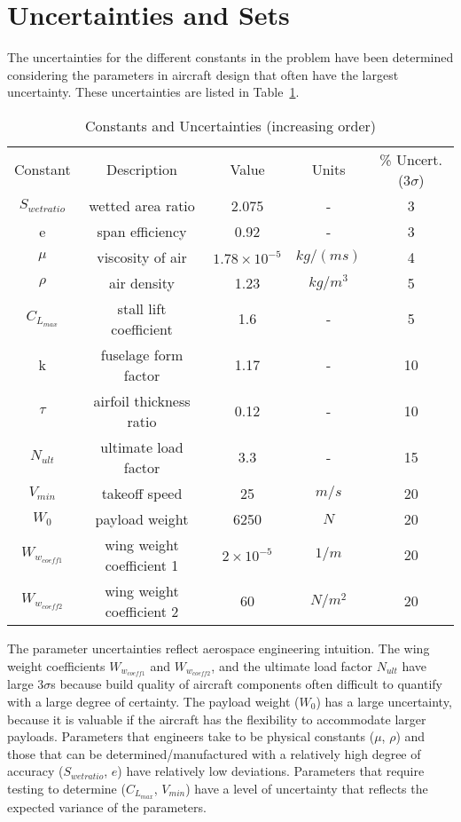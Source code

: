 \section{Uncertainties and Sets}

The uncertainties for the different constants in the problem have been determined
considering the parameters in aircraft design that often have the largest uncertainty.
These uncertainties are listed in Table~\ref{tab:uncertainties}.

\begin{table}
\begin{center}
\caption{\label{tab:uncertainties} Constants and Uncertainties (increasing order)}
\begin{tabular}{c c c c c}
\hline
Constant & Description & Value & Units &\% Uncert. ($3\sigma$) \\
$S_{wetratio}$ & wetted area ratio & 2.075 & - & 3\\
e & span efficiency & 0.92 & - & 3\\
$\mu$ & viscosity of air & $1.78 \times 10^{-5}$ & $kg/(ms)$ & 4 \\
$\rho$ & air density & 1.23 & $kg/m^3$ & 5 \\
$C_{L_{max}}$ & stall lift coefficient & 1.6 & - & 5\\
k & fuselage form factor & 1.17 & - & 10\\
$\tau$ & airfoil thickness ratio & 0.12 & - & 10\\
$N_{ult}$ & ultimate load factor & 3.3 & - & 15\\
$V_{min}$ & takeoff speed & 25 & $m/s$ & 20\\
$W_0$ & payload weight & 6250 & $N$ & 20\\
$W_{w_{coeff1}}$ & wing weight coefficient 1 & $2 \times 10^{-5}$ & $1/m$ & 20\\
$W_{w_{coeff2}}$ & wing weight coefficient 2 & 60 & $N/m^2$ & 20\\
\hline
\end{tabular}
\end{center}
\end{table}

The parameter uncertainties reflect aerospace engineering intuition.
The wing weight coefficients $W_{w_{coeff1}}$ and $W_{w_{coeff2}}$, and the ultimate load factor $N_{ult}$ have
large $3\sigma$s because build quality of aircraft components often difficult to quantify with a large degree of certainty.
The payload weight ($W_0$) has a large uncertainty, because it is valuable if the aircraft
has the flexibility to accommodate larger payloads. Parameters that engineers take to be
physical constants ($\mu$, $\rho$) and those that can be determined/manufactured with a relatively
high degree of accuracy ($S_{wetratio}$, $e$) have relatively low deviations.
Parameters that require testing to determine ($C_{L_{max}}$, $V_{min}$) have a level of uncertainty
that reflects the expected variance of the parameters.
